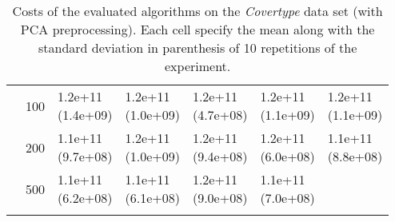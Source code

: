 \begin{longtable}{lllllll}
   & 100 &  \parbox[t]{17mm}{1.2e+11\\\small(1.4e+09)} &  \parbox[t]{17mm}{1.2e+11\\\small(1.0e+09)} &  \parbox[t]{17mm}{1.2e+11\\\small(4.7e+08)} &  \parbox[t]{17mm}{1.2e+11\\\small(1.1e+09)} &  \parbox[t]{17mm}{1.2e+11\\\small(1.1e+09)} \\
   & 200 &  \parbox[t]{17mm}{1.1e+11\\\small(9.7e+08)} &  \parbox[t]{17mm}{1.2e+11\\\small(1.0e+09)} &  \parbox[t]{17mm}{1.2e+11\\\small(9.4e+08)} &  \parbox[t]{17mm}{1.2e+11\\\small(6.0e+08)} &  \parbox[t]{17mm}{1.1e+11\\\small(8.8e+08)} \\
   & 500 &  \parbox[t]{17mm}{1.1e+11\\\small(6.2e+08)} &  \parbox[t]{17mm}{1.1e+11\\\small(6.1e+08)} &  \parbox[t]{17mm}{1.2e+11\\\small(9.0e+08)} &  \parbox[t]{17mm}{1.1e+11\\\small(7.0e+08)} &                 \\
\bottomrule
\caption{Costs of the evaluated algorithms on the \textit{Covertype} data set (with PCA preprocessing). Each cell specify the mean along with the standard deviation in parenthesis of 10 repetitions of the experiment.}
\label{tab:real-cost-mean-std-covertype-pca}
\end{longtable}

